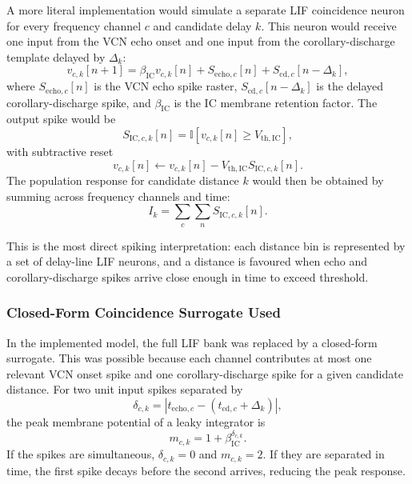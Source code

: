 A more literal implementation would simulate a separate LIF coincidence neuron for every frequency channel $c$ and candidate delay $k$. This neuron would receive one input from the VCN echo onset and one input from the corollary-discharge template delayed by $\Delta_k$:
\begin{equation}
    v_{c,k}[n+1]
    =
    \beta_{\mathrm{IC}} v_{c,k}[n]
    +
    S_{\mathrm{echo},c}[n]
    +
    S_{\mathrm{cd},c}[n-\Delta_k],
\end{equation}
where $S_{\mathrm{echo},c}[n]$ is the VCN echo spike raster, $S_{\mathrm{cd},c}[n-\Delta_k]$ is the delayed corollary-discharge spike, and $\beta_{\mathrm{IC}}$ is the IC membrane retention factor. The output spike would be
\begin{equation}
    S_{\mathrm{IC},c,k}[n]
    =
    \mathbb{I}
    \left[
        v_{c,k}[n] \geq V_{\mathrm{th,IC}}
    \right],
\end{equation}
with subtractive reset
\begin{equation}
    v_{c,k}[n]
    \leftarrow
    v_{c,k}[n]
    -
    V_{\mathrm{th,IC}} S_{\mathrm{IC},c,k}[n].
\end{equation}
The population response for candidate distance $k$ would then be obtained by summing across frequency channels and time:
\begin{equation}
    I_k
    =
    \sum_c \sum_n S_{\mathrm{IC},c,k}[n].
\end{equation}

This is the most direct spiking interpretation: each distance bin is represented by a set of delay-line LIF neurons, and a distance is favoured when echo and corollary-discharge spikes arrive close enough in time to exceed threshold.

\subsubsection{Closed-Form Coincidence Surrogate Used}

In the implemented model, the full LIF bank was replaced by a closed-form surrogate. This was possible because each channel contributes at most one relevant VCN onset spike and one corollary-discharge spike for a given candidate distance. For two unit input spikes separated by
\begin{equation}
    \delta_{c,k}
    =
    \left|
        t_{\mathrm{echo},c}
        -
        \left(
            t_{\mathrm{cd},c}
            +
            \Delta_k
        \right)
    \right|,
\end{equation}
the peak membrane potential of a leaky integrator is
\begin{equation}
    m_{c,k}
    =
    1
    +
    \beta_{\mathrm{IC}}^{\delta_{c,k}}.
\end{equation}
If the spikes are simultaneous, $\delta_{c,k}=0$ and $m_{c,k}=2$. If they are separated in time, the first spike decays before the second arrives, reducing the peak response.

